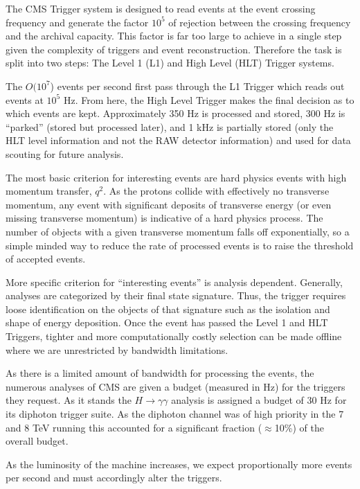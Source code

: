 The CMS Trigger system is designed to read events at the event crossing frequency and generate the
 factor $10^5$ of rejection between the crossing frequency and the archival capacity. This factor 
is far too large to achieve in a single step given the complexity of triggers and event reconstruction. 
Therefore the task is split into two steps: The Level 1 (L1) and High Level (HLT) Trigger systems.

The $O(10^7$) events per second first pass through the L1 Trigger which reads out events at $10^5$ Hz. 
From here, the High Level Trigger makes the final decision as to which events are kept. 
Approximately 350 Hz is processed and stored, 300 Hz is ``parked'' (stored but processed later), 
and 1 kHz is partially stored (only the HLT level information and not the RAW detector information) 
and used for data scouting for future analysis.  

The most basic criterion for interesting events are hard physics events with high momentum transfer, $q^2$.
 As the protons collide with effectively no transverse momentum, any event with significant deposits of 
transverse energy (or even missing transverse momentum) is indicative of a hard physics process. 
The number of objects with a given transverse momentum falls off exponentially, so a simple minded way to
  reduce the rate of processed events is to raise the threshold of accepted events. 

More specific criterion for ``interesting events'' is analysis dependent. Generally, analyses are
 categorized by their final state signature. Thus, the trigger requires loose identification 
on the objects of that signature such as the isolation and shape of energy deposition. 
Once the event has passed the Level 1 and HLT Triggers, tighter and more computationally 
costly selection can be made offline where we are unrestricted by bandwidth limitations. 

As there is a limited amount of bandwidth for processing the events, the numerous analyses of CMS
 are given a budget (measured in Hz) for the triggers they request. As it stands the $H\rightarrow \gamma\gamma$ 
analysis is assigned a budget of 30 Hz for its diphoton trigger suite. As the diphoton channel was of 
high priority in the 7 and 8 TeV running this accounted for a significant fraction ($\approx$10\%) of the overall budget. 

As the luminosity of the machine increases, we expect proportionally more events per second and must accordingly alter the triggers. 

